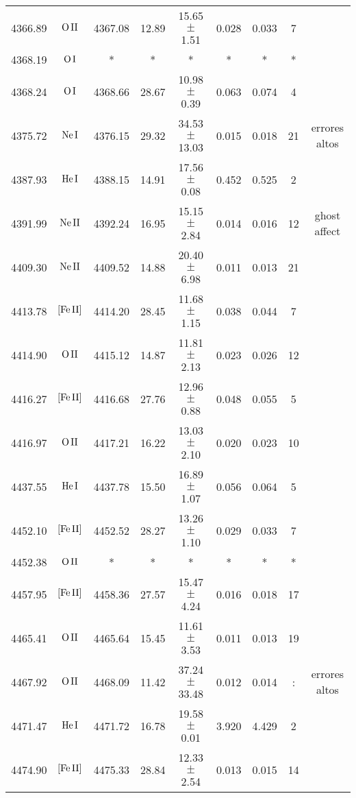 \documentclass{article}
\begin{document}
\begin{table*}
\begin{adjustbox}{width=\textwidth}
\begin{tabular}{ccccccccc}
4366.89 & $\mbox{O}\thinspace \mbox{II}$ & 4367.08 & 12.89 & 15.65 $\pm$ 1.51 & 0.028 & 0.033 & 7 &  \\
4368.19 & $\mbox{O}\thinspace \mbox{I}$ & * & * & * & * & * & * &  \\
4368.24 & $\mbox{O}\thinspace \mbox{I}$ & 4368.66 & 28.67 & 10.98 $\pm$ 0.39 & 0.063 & 0.074 & 4 &  \\
4375.72 & $\mbox{Ne}\thinspace \mbox{I}$ & 4376.15 & 29.32 & 34.53 $\pm$ 13.03 & 0.015 & 0.018 & 21 &  errores altos \\
4387.93 & $\mbox{He}\thinspace \mbox{I}$ & 4388.15 & 14.91 & 17.56 $\pm$ 0.08 & 0.452 & 0.525 & 2 &  \\
4391.99 & $\mbox{Ne}\thinspace \mbox{II}$ & 4392.24 & 16.95 & 15.15 $\pm$ 2.84 & 0.014 & 0.016 & 12 &  ghost affect \\
4409.30 & $\mbox{Ne}\thinspace \mbox{II}$ & 4409.52 & 14.88 & 20.40 $\pm$ 6.98 & 0.011 & 0.013 & 21 &  \\
4413.78 & $\mbox{[Fe}\thinspace \mbox{II]}$ & 4414.20 & 28.45 & 11.68 $\pm$ 1.15 & 0.038 & 0.044 & 7 &  \\
4414.90 & $\mbox{O}\thinspace \mbox{II}$ & 4415.12 & 14.87 & 11.81 $\pm$ 2.13 & 0.023 & 0.026 & 12 &  \\
4416.27 & $\mbox{[Fe}\thinspace \mbox{II]}$ & 4416.68 & 27.76 & 12.96 $\pm$ 0.88 & 0.048 & 0.055 & 5 &  \\
4416.97 & $\mbox{O}\thinspace \mbox{II}$ & 4417.21 & 16.22 & 13.03 $\pm$ 2.10 & 0.020 & 0.023 & 10 &  \\
4437.55 & $\mbox{He}\thinspace \mbox{I}$ & 4437.78 & 15.50 & 16.89 $\pm$ 1.07 & 0.056 & 0.064 & 5 &  \\
4452.10 & $\mbox{[Fe}\thinspace \mbox{II]}$ & 4452.52 & 28.27 & 13.26 $\pm$ 1.10 & 0.029 & 0.033 & 7 &  \\
4452.38 & $\mbox{O}\thinspace \mbox{II}$ & * & * & * & * & * & * &  \\
4457.95 & $\mbox{[Fe}\thinspace \mbox{II]}$ & 4458.36 & 27.57 & 15.47 $\pm$ 4.24 & 0.016 & 0.018 & 17 &  \\
4465.41 & $\mbox{O}\thinspace \mbox{II}$ & 4465.64 & 15.45 & 11.61 $\pm$ 3.53 & 0.011 & 0.013 & 19 &  \\
4467.92 & $\mbox{O}\thinspace \mbox{II}$ & 4468.09 & 11.42 & 37.24 $\pm$ 33.48 & 0.012 & 0.014 & : &  errores altos \\
4471.47 & $\mbox{He}\thinspace \mbox{I}$ & 4471.72 & 16.78 & 19.58 $\pm$ 0.01 & 3.920 & 4.429 & 2 &  \\
4474.90 & $\mbox{[Fe}\thinspace \mbox{II]}$ & 4475.33 & 28.84 & 12.33 $\pm$ 2.54 & 0.013 & 0.015 & 14 &  \\

\end{tabular}
\end{adjustbox}
\end{table*}
\end{document}
